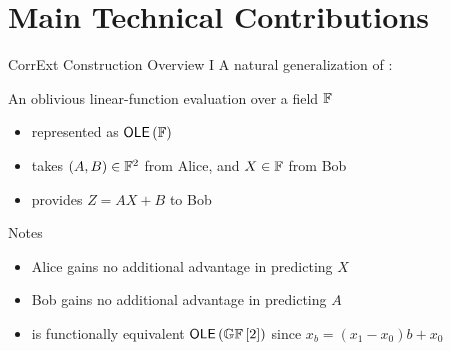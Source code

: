 \section{Main Technical Contributions}
\begin{frame}{CorrExt Construction Overview I}
%		
	A natural generalization of \OT:
	\begin{definition}
		An oblivious linear-function evaluation over a field $ {\mathbb F} $
		\begin{itemize}
			\item represented as $ \OLE[\bbF] $
			\item takes $ (A,B) \in {\mathbb F}^2 $ from Alice, and $ X \in {\mathbb F} $ from Bob
			\item provides $ Z = AX +B $ to Bob 
		\end{itemize}  
	\end{definition}
	{
	\begin{block}{Notes}
	\begin{itemize}
		\item Alice gains no additional advantage in predicting $ X $
		\item Bob gains no additional advantage in predicting  $ A $
		\item  \OT is functionally equivalent $ \OLE[\GF{2}] $ since $ x_b = (x_1 - x_0)b + x_0 $
	\end{itemize}
	\end{block}}
	
\end{frame}

